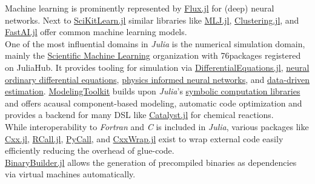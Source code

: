 Machine learning is prominently represented by \href{https://github.com/FluxML/Flux.jl.git}{Flux.jl} for (deep) neural networks. Next to \href{https://github.com/cstjean/ScikitLearn.jl.git}{SciKitLearn.jl} similar libraries like
\href{https://github.com/alan-turing-institute/MLJ.jl.git}{MLJ.jl}, \href{https://github.com/JuliaStats/Clustering.jl.git}{Clustering.jl}, and \href{https://github.com/FluxML/FastAI.jl.git}{FastAI.jl} 
offer common machine learning models.\\

One of the most influential domains in \textit{Julia} is the numerical simulation domain, mainly the \href{https://sciml.ai/}{Scientific Machine Learning} organization with 76\footnotemark[8] packages registered on JuliaHub. It provides tooling for
simulation via \href{https://github.com/SciML/DifferentialEquations.jl.git}{DifferentialEquations.jl}, \href{https://github.com/SciML/DiffEqFlux.jl.git}{neural ordinary differential equations}, \href{https://github.com/SciML/NeuralPDE.jl.git}{physics informed neural networks}, 
and \href{https://github.com/SciML/DataDrivenDiffEq.jl.git}{data-driven estimation}. \href{https://github.com/SciML/ModelingToolkit.jl.git}{ModelingToolkit} builds upon \textit{Julia}'s \href{https://github.com/JuliaSymbolics/Symbolics.jl.git}{symbolic computation libraries} and 
offers acausal component-based modeling, automatic code optimization and provides a backend for many DSL like \href{https://github.com/SciML/Catalyst.jl.git}{Catalyst.jl} for chemical reactions.\\

While interoperability to \textit{Fortran} and \textit{C} is included in \textit{Julia}, various packages like \href{https://github.com/JuliaInterop/Cxx.jl.git}{Cxx.jl}, \href{https://github.com/JuliaInterop/RCall.jl.git}{RCall.jl}, 
\href{https://github.com/JuliaPy/PyCall.jl.git}{PyCall}, and \href{https://github.com/JuliaInterop/CxxWrap.jl.git}{CxxWrap.jl} exist to wrap external code easily efficiently reducing the overhead of glue-code.\\
\href{https://github.com/JuliaPackaging/BinaryBuilder.jl}{BinaryBuilder.jl} allows the generation of precompiled binaries as dependencies via virtual machines automatically.
\newpage

